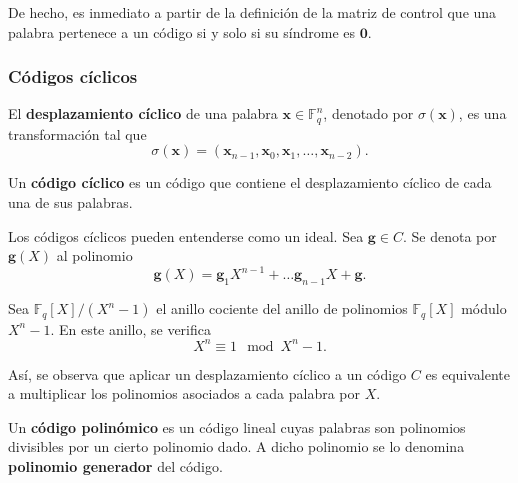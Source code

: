 De hecho, es inmediato a partir de la definición de la matriz de control que una palabra pertenece a un código si y solo si su síndrome es $\textbf{0}$.

\subsubsection{Códigos cíclicos}

\begin{definition}
	El \textbf{desplazamiento cíclico} de una palabra $\textbf{x} \in \mathbb{F}_q^n$, denotado por $\sigma(\textbf{x})$, es una transformación tal que
	\[\sigma(\textbf{x}) = (\textbf{x}_{n-1}, \textbf{x}_0, \textbf{x}_1, \dots, \textbf{x}_{n-2}).\]
\end{definition}

\begin{definition}
	Un \textbf{código cíclico} es un código que contiene el desplazamiento cíclico de cada una de sus palabras.
\end{definition}

\begin{remark}
	Los códigos cíclicos pueden entenderse como un ideal. Sea $\textbf{g} \in C$. Se denota por $\textbf{g}(X)$ al polinomio
	\[\textbf{g}(X) = \textbf{g}_1X^{n-1} + \hdots \textbf{g}_{n-1}X + \textbf{g}.\]
	
	Sea $\mathbb{F}_q[X] / (X^n - 1)$ el anillo cociente del anillo de polinomios $\mathbb{F}_q[X]$ módulo $X^n - 1$. En este anillo, se verifica
	\[X^n \equiv 1 \mod X^n - 1.\]
	
	Así, se observa que aplicar un desplazamiento cíclico a un código $C$ es equivalente a multiplicar los polinomios asociados a cada palabra por $X$.
\end{remark}



\begin{definition}
	Un \textbf{código polinómico} es un código lineal cuyas palabras son polinomios divisibles por un cierto polinomio dado. A dicho polinomio se lo denomina \textbf{polinomio generador} del código.
\end{definition}

